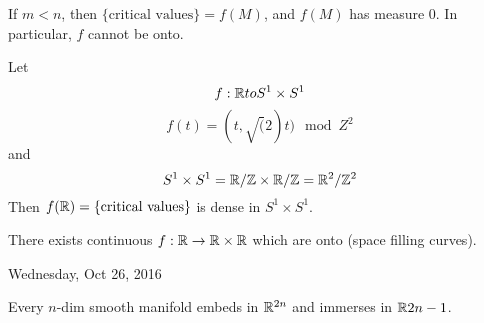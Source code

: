 \documentclass[11pt,leqno,oneside]{amsart}
\newcommand{\x}{\times}
\theoremstyle{mystyle} \newtheorem{thrm}[thm]{Theorem}
\theoremstyle{mystyle} \newtheorem{defi}[thm]{Definition}
\begin{document}
\begin{cor}
	If $m < n$, then $\{\text{critical values}\} = f(M)$, and $f(M)$ has measure 0.  In particular, $f$ cannot be onto.
\end{cor}
\begin{example}
	Let
	$$f : \R to S^1 \x S^1$$
	$$f(t) = (t, \sqrt(2)t) \mod Z^2$$
	and
	$$S^1 \x S^1 = \R/\Z \x \R/\Z = \R^2/\Z^2$$
	Then
	$f({\mathbb R}) = \{\text{critical values}\}$ is dense in $S^1 \x S^1$.
\end{example}
\begin{example}
	There exists continuous $f : \R \to \R \x \R$ which are onto (space filling curves).
\end{example}


Wednesday, Oct 26, 2016

\begin{thm}
	Every $n$-dim smooth manifold embeds in ${\mathbb R}^{2n}$ and immerses in ${\mathbb R}{2n-1}$.
\end{thm}
\end{document}
